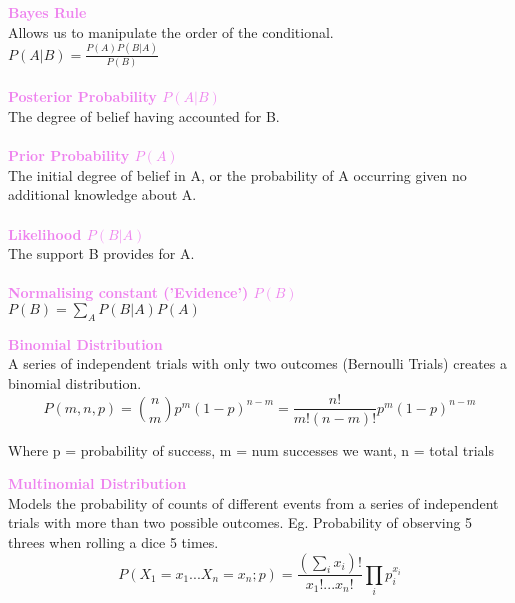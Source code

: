 \documentclass[a4paper,10pt]{article}
\begin{document}
\begin{shaded}
	\noindent \textcolor{Violet}{\textbf{Bayes Rule}}\\
	Allows us to manipulate the order of the conditional. \\
	$P(A|B) = \frac{P(A)P(B|A)}{P(B)}$ \\\\
	\textcolor{Violet}{\textbf{Posterior Probability $P(A|B)$}}\\
	The degree of belief having accounted for B. \\\\
	\textcolor{Violet}{\textbf{Prior Probability $P(A)$}}\\
	The initial degree of belief in A, or the probability of A occurring given no additional knowledge about A. \\\\
	\textcolor{Violet}{\textbf{Likelihood $P(B|A)$}} \\
	The support B provides for A. \\\\
	\textcolor{Violet}{\textbf{Normalising constant ('Evidence') $P(B)$}} \\
	$P(B) = \sum_{A}P(B|A)P(A)$
\end{shaded}	
\begin{shaded}
	\noindent \textcolor{Violet}{\textbf{Binomial Distribution}}\\
	A series of independent trials with only two outcomes (Bernoulli Trials) creates a binomial distribution. \\
	\begin{equation*}
		P(m,n,p) = {n \choose m} p^{m}(1-p)^{n-m} =\frac{n!}{m!(n-m)!} p^{m}(1-p)^{n-m}
	\end{equation*}
\end{shaded}
\noindent Where p = probability of success, m = num successes we want, n = total trials
\begin{shaded}
	\noindent \textcolor{Violet}{\textbf{Multinomial Distribution}}\\	
	Models the probability of counts of different events from a series of independent trials with more than two possible outcomes. Eg. Probability of observing 5 threes when rolling a dice 5 times.\\
	\begin{equation*}
		P(X_{1} = x_{1} ... X_{n} = x_{n}; p) = \frac{(\sum_{i}x_{i})!}{x_{1}! ... x_{n}!} \prod_{i}p_{i}^{x_{i}}
	\end{equation*}
\end{shaded}
\end{document}
